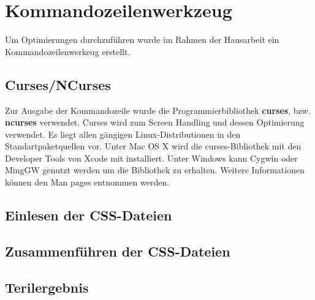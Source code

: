 \section{Kommandozeilenwerkzeug}
Um Optimierungen durchzuführen wurde im Rahmen der Hausarbeit ein Kommandozeilenwerkeug erstellt.

\subsection{Curses/NCurses}

Zur Ausgabe der Kommandozeile wurde die Programmierbibliothek \textbf{curses}, bzw. \textbf{ncurses} verwendet. Curses wird zum Screen Handling und dessen Optimierung verwendet. Es liegt allen gängigen Linux-Distributionen in den Standartpaketquellen vor. Unter Mac OS X wird die curses-Bibliothek mit den Developer Tools von Xcode mit installiert. Unter Windows kann Cygwin oder MingGW genutzt werden um die Bibliothek zu erhalten. Weitere Informationen können den Man pages entnommen werden.

\subsection{Einlesen der CSS-Dateien}
\subsection{Zusammenführen der CSS-Dateien}
\subsection{Terilergebnis}
